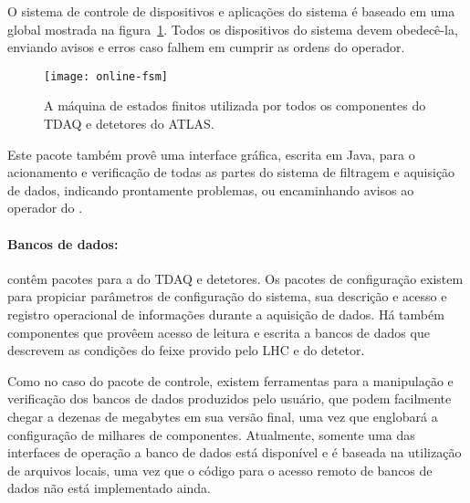 O sistema de controle de dispositivos e aplicações do sistema  é
baseado em uma  global mostrada na
figura~\ref{fig:online-fsm}. Todos os dispositivos do sistema devem
obedecê-la, enviando avisos e erros caso falhem em cumprir as ordens do
operador.

\begin{figure}
\begin{center}
\texttt{[image: online-fsm]}
\end{center}
\caption{A máquina de estados finitos utilizada por todos os componentes do
TDAQ e detetores do ATLAS.}
\label{fig:online-fsm}
\end{figure}

Este pacote também provê uma interface gráfica, escrita em Java, para o
acionamento e verificação de todas as partes do sistema de filtragem e
aquisição de dados, indicando prontamente problemas, ou encaminhando avisos ao
operador do .



\paragraph{Bancos de dados:} contêm pacotes para a  do TDAQ e
detetores. Os pacotes de configuração existem para propiciar parâmetros de
configuração do sistema, sua descrição e acesso e registro operacional de
informações durante a aquisição de dados. Há também componentes que provêem
acesso de leitura e escrita a bancos de dados que descrevem as condições do
feixe provido pelo LHC e do detetor.

Como no caso do pacote de controle, existem ferramentas para a manipulação e
verificação dos bancos de dados produzidos pelo usuário, que podem facilmente
chegar a dezenas de megabytes em sua versão final, uma vez que englobará a
configuração de milhares de componentes. Atualmente, somente uma das
interfaces de operação a banco de dados está disponível e é baseada na
utilização de arquivos locais, uma vez que o código para o acesso remoto de
bancos de dados não está implementado ainda.

